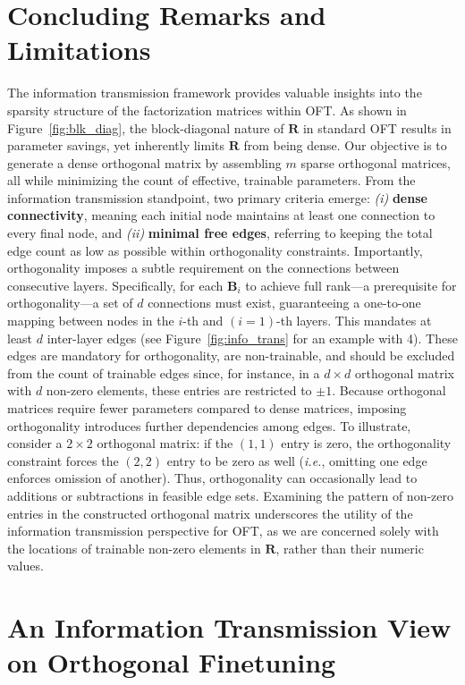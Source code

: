 \section{Concluding Remarks and Limitations}

The information transmission framework provides valuable insights into the sparsity structure of the factorization matrices within OFT. As shown in Figure~\ref{fig:blk_diag}, the block-diagonal nature of $\bm{R}$ in standard OFT results in parameter savings, yet inherently limits $\bm{R}$ from being dense. Our objective is to generate a dense orthogonal matrix by assembling $m$ sparse orthogonal matrices, all while minimizing the count of effective, trainable parameters. From the information transmission standpoint, two primary criteria emerge: \emph{(i)} \textbf{dense connectivity}, meaning each initial node maintains at least one connection to every final node, and \emph{(ii)} \textbf{minimal free edges}, referring to keeping the total edge count as low as possible within orthogonality constraints. Importantly, orthogonality imposes a subtle requirement on the connections between consecutive layers. Specifically, for each $\bm{B}_i$ to achieve full rank—a prerequisite for orthogonality—a set of $d$ connections must exist, guaranteeing a one-to-one mapping between nodes in the $i$-th and $(i=1)$-th layers. This mandates at least $d$ inter-layer edges (see Figure~\ref{fig:info_trans} for an example with 4). These edges are mandatory for orthogonality, are non-trainable, and should be excluded from the count of trainable edges since, for instance, in a $d\times d$ orthogonal matrix with $d$ non-zero elements, these entries are restricted to $\pm 1$. Because orthogonal matrices require fewer parameters compared to dense matrices, imposing orthogonality introduces further dependencies among edges. To illustrate, consider a $2\times 2$ orthogonal matrix: if the $(1,1)$ entry is zero, the orthogonality constraint forces the $(2,2)$ entry to be zero as well (\emph{i.e.}, omitting one edge enforces omission of another). Thus, orthogonality can occasionally lead to additions or subtractions in feasible edge sets. Examining the pattern of non-zero entries in the constructed orthogonal matrix underscores the utility of the information transmission perspective for OFT, as we are concerned solely with the locations of trainable non-zero elements in $\bm{R}$, rather than their numeric values.

\section{An Information Transmission View on Orthogonal Finetuning}

